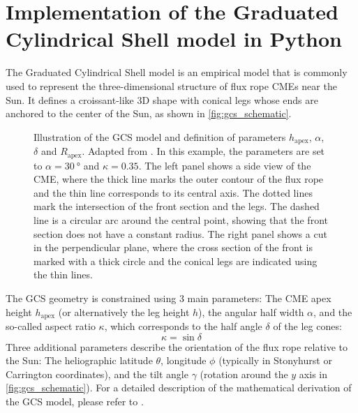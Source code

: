 \chapter{Implementation of the Graduated Cylindrical Shell model in Python}
\label{chp:GCS_Python}

The Graduated Cylindrical Shell model \citep[GCS,][]{Thernisien-2006-GCS,Thernisien-2011-GCS} is an empirical model that is commonly used to represent the three-dimensional structure of flux rope CMEs near the Sun. It defines a croissant-like 3D shape with conical legs whose ends are anchored to the center of the Sun, as shown in \autoref{fig:gcs_schematic}.

\begin{figure}
    
    \caption[Illustration of the GCS model]{Illustration of the GCS model and definition of parameters $h_\text{apex}$, $\alpha$, $\delta$ and $R_\text{apex}$. Adapted from \citet{Thernisien-2011-GCS}. In this example, the parameters are set to $\alpha = \SI{30}{\degree}$ and $\kappa = 0.35$. The left panel shows a side view of the CME, where the thick line marks the outer contour of the flux rope and the thin line corresponds to its central axis. The dotted lines mark the intersection of the front section and the legs. The dashed line is a circular arc around the central point, showing that the front section does not have a constant radius. The right panel shows a cut in the perpendicular plane, where the cross section of the front is marked with a thick circle and the conical legs are indicated using the thin lines.}
    \label{fig:gcs_schematic}
\end{figure}

The GCS geometry is constrained using 3 main parameters: The CME apex height $h_\text{apex}$ (or alternatively the leg height $h$), the angular half width $\alpha$, and the so-called aspect ratio $\kappa$, which corresponds to the half angle $\delta$ of the leg cones:
\begin{equation}
    \kappa = \sin \delta
\end{equation}
Three additional parameters describe the orientation of the flux rope relative to the Sun: The heliographic latitude $\theta$, longitude $\phi$ (typically in Stonyhurst or Carrington coordinates), and the tilt angle $\gamma$ (rotation around the $y$ axis in \autoref{fig:gcs_schematic}). For a detailed description of the mathematical derivation of the GCS model, please refer to \citet{Thernisien-2011-GCS}.

